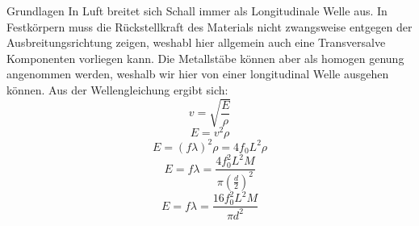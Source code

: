 \documentclass[twoside]{protokoll}
\begin{document}
\begin{aufgabe}{Grundlagen}
    In Luft breitet sich Schall immer als Longitudinale Welle aus.
    In Festkörpern muss die Rückstellkraft des Materials nicht zwangsweise entgegen der Ausbreitungsrichtung zeigen, weshabl hier allgemein auch eine Transversalve Komponenten vorliegen kann.
    Die Metallstäbe können aber als homogen genung angenommen werden, weshalb wir hier von einer longitudinal Welle ausgehen können.
    Aus der Wellengleichung ergibt sich:
    \begin{equation}
         v = \sqrt{\frac{E}{\rho}}
    \end{equation}
    \begin{equation}
         E = v ^2 \rho
    \end{equation}
    \begin{equation}
        E = (f \lambda)^2 \rho = 4 f_0 L ^2 \rho
    \end{equation}
    \begin{equation}
        E = f \lambda = \frac{ 4 f_0^2 L ^2 M}{\pi (\frac{d}{2}) ^2}
    \end{equation}
    \begin{equation}
        E = f \lambda = \frac{ 16 f_0^2 L ^2 M}{\pi d ^2}
    \end{equation}

     
\end{aufgabe}
\end{document}
